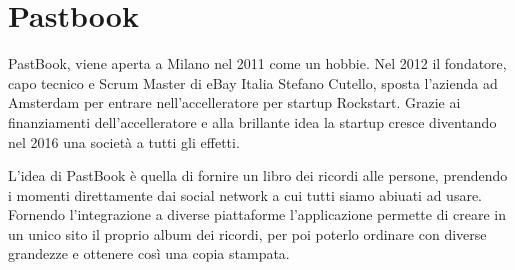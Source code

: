 \mainmatter

\section{Pastbook}
PastBook, viene aperta a Milano nel 2011 come un hobbie. Nel 2012 il fondatore,
capo tecnico e Scrum Master di eBay Italia Stefano Cutello, sposta l'azienda ad
Amsterdam per entrare nell'accelleratore per startup Rockstart. Grazie ai
finanziamenti dell'accelleratore e alla brillante idea la startup cresce
diventando nel 2016 una società a tutti gli effetti.

L'idea di PastBook è quella di fornire un libro dei ricordi alle
persone, prendendo i momenti direttamente dai social network a cui tutti siamo
abiuati ad usare. Fornendo l'integrazione a diverse piattaforme l'applicazione
permette di creare in un unico sito il proprio album dei ricordi, per poi
poterlo ordinare con diverse grandezze e ottenere così una copia stampata.
